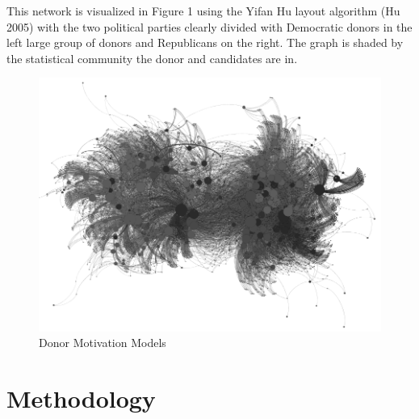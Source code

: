 \documentclass[12pt,]{article}
\begin{document}
This network is visualized in Figure 1 using the Yifan Hu layout
algorithm (Hu 2005) with the two political parties clearly divided with
Democratic donors in the left large group of donors and Republicans on
the right. The graph is shaded by the statistical community the donor
and candidates are in.

\begin{figure}
\centering
\includegraphics{../tables_and_figures/fig_1_greyscale_white.png}
\caption{Donor Motivation Models}
\end{figure}

\hypertarget{methodology}{%
\section{Methodology}\label{methodology}}
\end{document}
